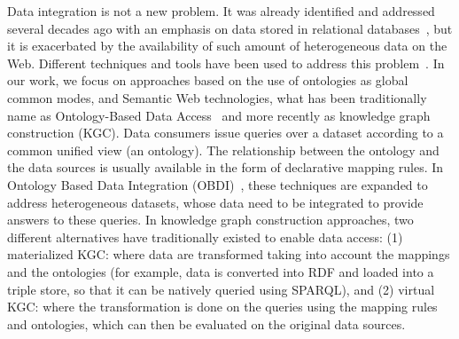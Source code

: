 Data integration is not a new problem. It was already identified and addressed several decades ago with an emphasis on data stored in relational databases~\citep{wiederhold1992mediators}, but it is exacerbated by the availability of such amount of heterogeneous data on the Web. Different techniques and tools have been used to address this problem~\citep{gruser1998wrapper,Lenzerini02,Halevy18}. In our work, we focus on approaches based on the use of ontologies as global common modes, and Semantic Web technologies, what has been traditionally name as Ontology-Based Data Access~\citep{poggi2008linking} and more recently as knowledge graph construction (KGC). Data consumers issue queries over a dataset according to a common unified view (an ontology). The relationship between the ontology and the data sources is usually available in the form of declarative mapping rules. In Ontology Based Data Integration (OBDI)~\citep{poggi2008linking}, these techniques are expanded to address heterogeneous datasets, whose data need to be integrated to provide answers to these queries. In knowledge graph construction approaches, two different alternatives have traditionally existed to enable data access: (1) materialized KGC: where data are transformed taking into account the mappings and the ontologies (for example, data is converted into RDF and loaded into a triple store, so that it can be natively queried using SPARQL), and (2) virtual KGC: where the transformation is done on the queries using the mapping rules and ontologies, which can then be evaluated on the original data sources. 


